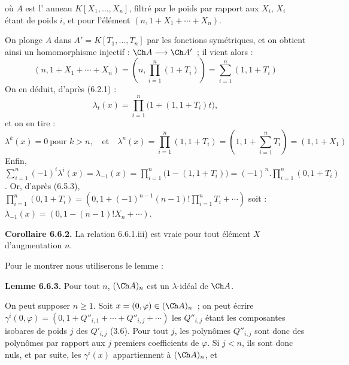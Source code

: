 où \(A\) est l'%
anneau \(K[X_1,\ldots,X_n]\), filtré par le poids par rapport aux \(X_i\), \(X_i\) étant de poids \(i\), et pour l'élément \((n,1+X_1+\cdots+X_n)\).

On plonge \(A\) dans \(A'=K[T_1,\ldots,T_n]\) par les fonctions symétriques, et on obtient ainsi un homomorphisme injectif : \(\Ch A\longrightarrow\Ch A'\)~; il vient alors :
\[
 (n,1+X_1+\cdots+X_n)
 =
 \left(n,\prod_{i=1}^n(1+T_i)\right)
 =
 \sum_{i=1}^n(1,1+T_i)
\]
On en déduit, d'après (6.2.1) :
\[
  \lambda_t(x)=\prod_{i=1}^n\bigl(1+(1,1+T_i)t\bigr),
\]
et on en tire :
\[
  \lambda^k(x)=0\ \text{pour }k>n,\quad\text{et}\quad
  \lambda^n(x)=\prod_{i=1}^n(1,1+T_i)
   =\left(1,1+\sum_{i=1}^nT_i\right)=(1,1+X_1)
\]
Enfin, \(\sum_{i=1}^n(-1)^i\lambda^i(x)=\lambda_{-1}(x)=\prod_{i=1}^n\bigl(1-(1,1+T_i)\bigr)=(-1)^n.\prod_{i=1}^n(0,1+T_i)\).
Or, d'après (6.5.3), \(\prod_{i=1}^n(0,1+T_i)=\left(0,1+(-1)^{n-1}(n-1)!\prod_{i=1}^nT_i+\cdots\right)\)
soit : \(\lambda_{-1}(x)=(0,1-(n-1)!X_n+\cdots)\).

\textbf{Corollaire 6.6.2.} La relation 6.6.1.iii) est vraie pour tout élément \(X\) d'augmentation \(n\).

Pour le montrer nous utiliserons le lemme :

\textbf{Lemme 6.6.3.} Pour tout \(n\), \((\Ch A)_n\) est un \(\lambda\)-idéal de \(\Ch A\).

On peut supposer \(n\ge1\). Soit \(x=(0,\varphi)\in(\Ch A)_n\)~; on peut écrire \(\gamma^i(0,\varphi)=(0,1+Q''_{i,1}+\cdots+Q''_{i,j}+\cdots)\) les \(Q''_{i,j}\) étant les composantes isobares de poids \(j\) des \(Q'_{i,j}\) (3.6). Pour tout \(j\), les polynômes \(Q''_{i,j}\) sont donc des polynômes par rapport aux \(j\) premiers coefficients de \(\varphi\). Si \(j<n\), ils sont donc nuls, et par suite, les \(\gamma^i(x)\) appartiennent à \((\Ch A)_n\), et 
